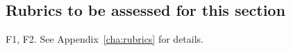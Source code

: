 
%	

\subsection{Rubrics to be assessed for this section}

F1, F2. See Appendix~\ref{cha:rubrics} for details.




